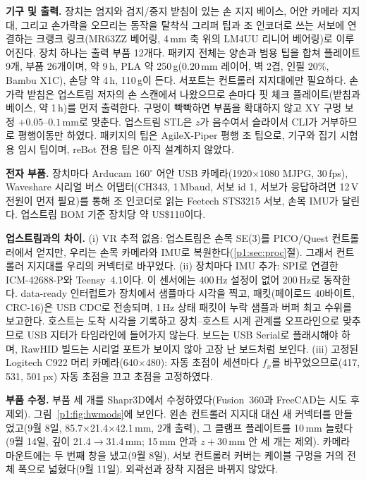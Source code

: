 \documentclass[conference,10pt]{IEEEtran}
\newcommand{\mm}{\,mm\xspace}
\begin{document}
\textbf{기구 및 출력.} 장치는 엄지와 검지/중지 받침이 있는 손 지지 베이스, 어안 카메라 지지대, 그리고 손가락을 오므리는 동작을 탈착식
그리퍼 팁과 조 인코더로 쓰는 서보에 연결하는 크랭크 링크(MR63ZZ 베어링, 4\mm 축 위의 LM4UU 리니어 베어링)로 이루어진다. 장치 하나는
출력 부품 12개다. 패키지 전체는 양손과 범용 팁을 합쳐 플레이트 9개, 부품 26개이며, 약 9\,h, PLA 약 250\,g(0.20\mm 레이어, 벽 2겹,
인필 20\%, Bambu X1C), 손당 약 4\,h, 110\,g이 든다. 서포트는 컨트롤러 지지대에만 필요하다. 손가락 받침은 업스트림 저자의 손 스캔에서
나왔으므로 손마다 핏 체크 플레이트(받침과 베이스, 약 1\,h)를 먼저 출력한다. 구멍이 빡빡하면 부품을 확대하지 않고 XY 구멍 보정
$+0.05$--$0.1$\mm{}로 맞춘다. 업스트림 STL은 $z$가 음수여서 슬라이서 CLI가 거부하므로 평행이동만 하였다. 패키지의 팁은 AgileX-Piper
평행 조 팁으로, 기구와 집기 시험용 임시 팁이며, reBot 전용 팁은 아직 설계하지 않았다.

\textbf{전자 부품.} 장치마다 Arducam 160$^\circ$ 어안 USB 카메라(1920$\times$1080 MJPG, 30\,fps), Waveshare 시리얼 버스 어댑터(CH343,
1\,Mbaud, 서보 id 1, 서보가 응답하려면 12\,V 전원이 먼저 필요)를 통해 조 인코더로 읽는 Feetech STS3215 서보, 손목 IMU가 달린다. 업스트림
BOM 기준 장치당 약 US\$110이다.

\textbf{업스트림과의 차이.} (i) VR 추적 없음: 업스트림은 손목 SE(3)를 PICO/Quest 컨트롤러에서 얻지만, 우리는 손목 카메라와 IMU로
복원한다(\ref{p1:sec:proc}절). 그래서 컨트롤러 지지대를 우리의 커넥터로 바꾸었다. (ii) 장치마다 IMU 추가: SPI로 연결한 ICM-42688-P와
Teensy~4.1이다. 이 센서에는 400\,Hz 설정이 없어 200\,Hz로 동작한다. data-ready 인터럽트가 장치에서 샘플마다 시각을 찍고, 패킷(페이로드
40바이트, CRC-16)은 USB CDC로 전송되며, 1\,Hz 상태 패킷이 누락 샘플과 버퍼 최고 수위를 보고한다. 호스트는 도착 시각을 기록하고
장치--호스트 시계 관계를 오프라인으로 맞추므로 USB 지터가 타임라인에 들어가지 않는다. 보드는 USB Serial로 플래시해야 하며, RawHID
빌드는 시리얼 포트가 보이지 않아 고장 난 보드처럼 보인다. (iii) 고정된 Logitech C922 머리 카메라(640$\times$480): 자동 초점이 세션마다
$f_x$를 바꾸었으므로(417, 531, 501\,px) 자동 초점을 끄고 초점을 고정하였다.

\textbf{부품 수정.} 부품 세 개를 Shapr3D에서 수정하였다(Fusion~360과 FreeCAD는 시도 후 제외). 그림~\ref{p1:fig:hwmods}에 보인다. 왼손
컨트롤러 지지대 대신 새 커넥터를 만들었고(9월 8일, 85.7$\times$21.4$\times$42.1\mm, 2개 출력), 그 클램프 플레이트를 10\mm 늘렸다(9월 14일,
깊이 21.4$\to$31.4\mm; 15\mm 안과 $z{+}30$\mm 안 세 개는 제외). 카메라 마운트에는 두 번째 창을 냈고(9월 8일), 서보 컨트롤러 커버는 케이블
구멍을 거의 전체 폭으로 넓혔다(9월 11일). 외곽선과 장착 지점은 바뀌지 않았다.
\end{document}
